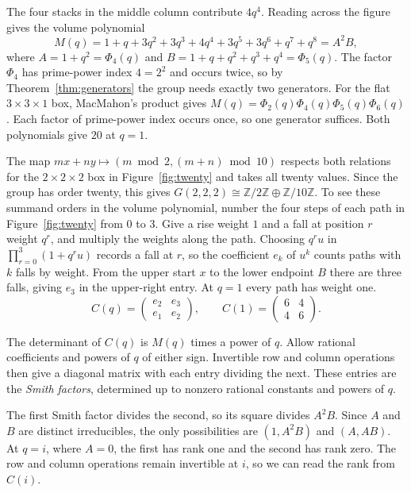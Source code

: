 \documentclass[11pt]{article}
\newcommand{\Z}{\mathbb Z}
\begin{document}
The four stacks in the middle column contribute \(4q^4\). Reading across
the figure gives the volume polynomial
\[
 M(q)=1+q+3q^2+3q^3+4q^4+3q^5+3q^6+q^7+q^8=A^2B,
\]
where \(A=1+q^2=\Phi_4(q)\) and \(B=1+q+q^2+q^3+q^4=\Phi_5(q)\).
The factor \(\Phi_4\) has prime-power index \(4=2^2\) and occurs twice,
so by Theorem~\ref{thm:generators} the group needs exactly two generators. For the flat
\(3\times3\times1\) box, MacMahon's product gives
\(M(q)=\Phi_2(q)\Phi_4(q)\Phi_5(q)\Phi_6(q)\). Each factor of
prime-power index occurs once, so one generator suffices. Both polynomials give
\(20\) at \(q=1\).

The map \(mx+ny\mapsto(m\bmod2,(m+n)\bmod10)\) respects both relations
for the \(2\times2\times2\) box in Figure~\ref{fig:twenty} and takes all twenty values.
Since the group has order twenty, this gives
\(G(2,2,2)\cong\Z/2\Z\oplus\Z/10\Z\).
To see these summand orders in the volume polynomial, number the four
steps of each path in Figure~\ref{fig:twenty} from \(0\) to \(3\).
Give a rise weight \(1\) and a fall at position \(r\) weight \(q^r\),
and multiply the weights along the path. Choosing \(q^r u\) in
\(\prod_{r=0}^3(1+q^r u)\) records a fall at \(r\), so the coefficient
\(e_k\) of \(u^k\) counts paths with \(k\) falls by weight. From the
upper start \(x\) to the lower endpoint \(B\) there are three falls,
giving \(e_3\) in the upper-right entry. At \(q=1\) every path has weight one.
\[
 C(q)=\begin{pmatrix}e_2&e_3\\e_1&e_2\end{pmatrix},
 \qquad C(1)=\begin{pmatrix}6&4\\4&6\end{pmatrix}.
\]

The determinant of \(C(q)\) is \(M(q)\) times a power of \(q\).
Allow rational coefficients and powers of \(q\) of either sign. Invertible
row and column operations then give a diagonal matrix with each entry
dividing the next. These entries are the \emph{Smith factors}, determined
up to nonzero rational constants and powers of \(q\).

The first Smith factor divides the second, so its square divides \(A^2B\).
Since \(A\) and \(B\) are distinct irreducibles, the only possibilities
are \((1,A^2B)\) and \((A,AB)\). At \(q=i\), where
\(A=0\), the first has rank one and the second has rank zero.
The row and column operations remain invertible at \(i\), so we can
read the rank from \(C(i)\).
\end{document}
